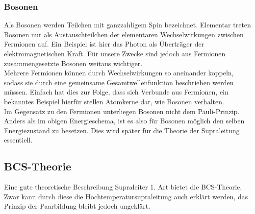         \subsubsection{Bosonen}
Als Bosonen werden Teilchen mit ganzzahligem Spin bezeichnet. Elementar treten 
Bosonen nur als Austauschteilchen der elementaren Wechselwirkungen zwischen 
Fermionen auf. Ein Beispiel ist hier das Photon als Überträger der 
elektromagnetischen Kraft. Für unsere Zwecke sind jedoch aus Fermionen
zusammengesetzte Bosonen weitaus wichtiger.
\vspace{3pt}\\
Mehrere Fermionen können durch Wechselwirkungen so aneinander koppeln, sodass sie
durch eine gemeinsame Gesamtwellenfunktion beschrieben werden müssen. Einfach
hat dies zur Folge, dass sich Verbunde aus Fermionen, ein bekanntes Beispiel 
hierfür stellen Atomkerne dar, wie Bosonen verhalten. 
\vspace{3pt}\\
Im Gegensatz zu den Fermionen unterliegen Bosonen nicht dem Pauli-Prinzip. Anders
als im obigen Energieschema, ist es also für Bosonen möglich den selben
Energiezustand zu besetzen. Dies wird später für die Theorie der Supraleitung 
essentiell. \cite{bosonwiki}

	\subsection{BCS-Theorie}
Eine gute theoretische Beschreibung Supraleiter 1. Art bietet die BCS-Theorie. 
Zwar kann durch diese die Hochtemperatursupraleitung auch erklärt werden, das 
Prinzip der Paarbildung bleibt jedoch ungeklärt.

